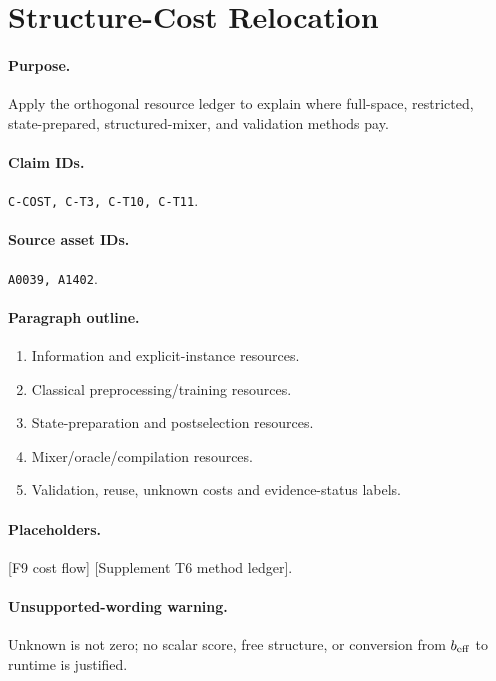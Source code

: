 \section{Structure-Cost Relocation}

\paragraph{Purpose.}
Apply the orthogonal resource ledger to explain where full-space, restricted,
state-prepared, structured-mixer, and validation methods pay.

\paragraph{Claim IDs.}
\texttt{C-COST, C-T3, C-T10, C-T11}.

\paragraph{Source asset IDs.}
\texttt{A0039, A1402}.

\paragraph{Paragraph outline.}
\begin{enumerate}
  \item Information and explicit-instance resources.
  \item Classical preprocessing/training resources.
  \item State-preparation and postselection resources.
  \item Mixer/oracle/compilation resources.
  \item Validation, reuse, unknown costs and evidence-status labels.
\end{enumerate}

\paragraph{Placeholders.}
[F9 cost flow] [Supplement T6 method ledger].

\paragraph{Unsupported-wording warning.}
Unknown is not zero; no scalar score, free structure, or conversion from
$b_{\rm eff}$ to runtime is justified.
